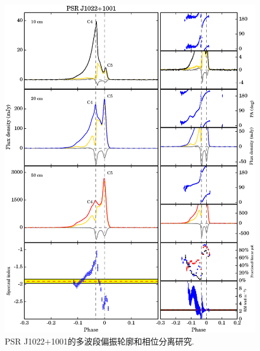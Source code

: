 \begin{figure}
\begin{center}
\includegraphics[width=6 in]{1022.ps}
\caption{PSR J1022$+$1001的多波段偏振轮廓和相位分离研究.}
\label{1022}
\end{center}
\end{figure}

